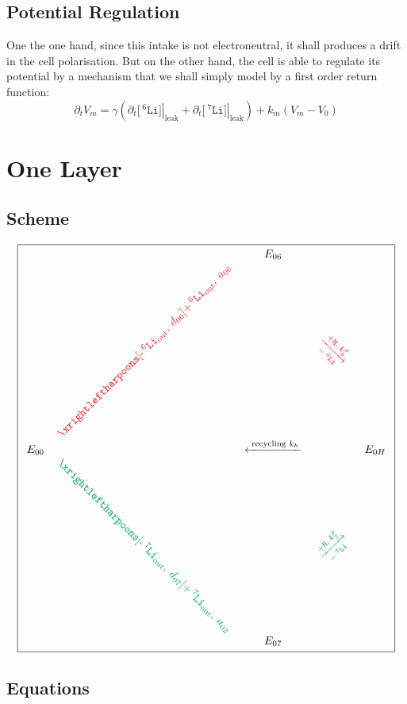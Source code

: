\documentclass[aps,onecolumn,11pt]{revtex4}
\newcommand{\mychem}[1]{\mathtt{#1}}
\newcommand{\myconc}[1]{\big[#1\big]}
\newcommand{\spLi}[1]{{\!~^{#1}\mychem{Li}}}
\newcommand{\Li}[1]{\myconc{\spLi{#1}}}
\newcommand{\spproton}{\mychem{H}}
\newcommand{\myleak}[1]{\left.{#1}\right\vert_{\mathrm{leak}}}
\newcommand{\myout}[1]{{#1}_{\mathrm{out}}}
\newcommand{\spLiOut}[1]{\myout{\spLi{#1}}}
\newcommand{\myrotate}[2]{\rotatebox[origin=c]{#1}{#2}}
\newcommand{\outLi}[1]{\text{-}\spLiOut{#1}}
\newcommand{\mycolor}[2]{\ifthenelse{\equal{#1}{6}}{{\color{Red}#2}}{{\color{Green}#2}}}
\begin{document}
\subsection{Potential Regulation}
One the one hand, since this intake is not electroneutral, it shall produces a drift in the cell polarisation. But on the other hand, the cell is able to regulate its potential 
by a mechanism that we shall simply model by a first order return function:
\begin{equation}
	\partial_t V_m = \gamma \left( \partial_t \myleak{\Li{6}} + \partial_t \myleak{\Li{7}} \right) + k_m \left(V_m-V_0\right)
\end{equation}

\section{One Layer}

\subsection{Scheme}
{
\Large
\begin{equation}
\boxed{
\begin{array}{ccccc}
 & & E_{06}  &  & \\
 &  \mycolor{6}{\myrotate{45}{$\xrightleftharpoons[\outLi{6},\;d_{06}]{+\spLiOut{6},\;a_{06}}$}} &   & \mycolor{6}{\myrotate{-45}{$\xrightarrow[-\spLi{6}]{+ \spproton, \; k^p_6}$}} &  \\
E_{00}  &  & \xleftarrow{\text{ recycling } k_h } &   & E_{0H} \\
  & \mycolor{7}{\myrotate{-45}{$\xrightleftharpoons[\outLi{7},\;d_{07}]{+\spLiOut{7},\;a_{02}}$}} &   & \mycolor{7}{\myrotate{+45}{$\xrightarrow[-\spLi{7}]{+ \spproton, \; k^p_7}$}} & \\
 & & E_{07} & & \\
 \end{array}
 }
\end{equation}
}

\subsection{Equations}
\end{document}
